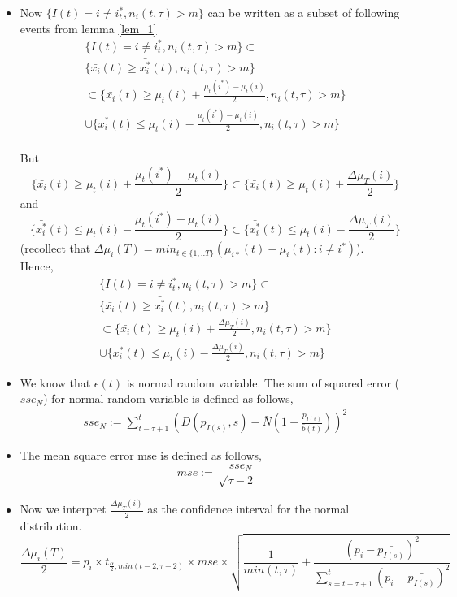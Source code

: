 \documentclass[compress, serif, onlymath, professionalfonts]{beamer}
\begin{document}
\begin{frame}[t,allowframebreaks]
\begin{enumerate}
\begin{itemize}
\item Now $\{I(t)=i\neq i^*_t, n_i(t,\tau)> m\}$ can be written as a subset of following events from lemma \ref{lem_1}
\begin{multline}
\{I(t)=i\neq i^*_t, n_i(t,\tau)> m\} \subset \\
\{\bar{x_i}(t) \geq \bar{x_i^*}(t), n_i(t,\tau)> m\}\\
 \subset \{ \bar{x_i}(t) \geq \mu_t(i) +\frac{\mu_t(i^*)-\mu_t(i)}{2}, n_i(t,\tau)> m\}
\\ \cup \{\bar{x_i^*}(t) \leq \mu_t(i)- \frac{\mu_t(i^*)-\mu_t(i)}{2}, n_i(t,\tau)> m\}
\end{multline}
\\
But $$\{ \bar{x_i}(t) \geq \mu_t(i) +\frac{\mu_t(i^*)-\mu_t(i)}{2}\} \subset \{ \bar{x_i}(t) \geq \mu_t(i) +\frac{\Delta\mu_T(i)}{2}\}$$
and
$$\{\bar{x_i^*}(t) \leq \mu_t(i)- \frac{\mu_t(i^*)-\mu_t(i)}{2}\} \subset \{\bar{x_i^*}(t) \leq \mu_t(i)- \frac{\Delta\mu_T(i)}{2}\} $$
(recollect that $\Delta \mu_i(T)=min_{t \in \{1,..T\}}(\mu_{i*}(t)-\mu_i(t):i \neq i^*)$).\\
Hence,
\begin{multline}
\label{eq5_1}
\{I(t)=i\neq i^*_t, n_i(t,\tau)> m\} \subset \\
\{\bar{x_i}(t) \geq \bar{x_i^*}(t), n_i(t,\tau)> m\}\\
 \subset \{ \bar{x_i}(t) \geq \mu_t(i) +\frac{\Delta\mu_T(i)}{2}, n_i(t,\tau)> m\}
\\ \cup \{ \bar{x_i^*}(t) \leq \mu_t(i)-\frac{\Delta\mu_T(i)}{2}, n_i(t,\tau)> m\}
\end{multline}
 \item
We know that $\epsilon(t)$ is normal random variable. The sum of squared error ($sse_N$)  for normal random variable is defined as follows,
\begin{equation}
\begin{split}
sse_N:=\sum_{t-\tau+1}^{t}(D(p_{I(s)},s)-\bar{N}(1-\frac{p_{I(s)}}{\bar{b}(t)}))^2 
\end{split}
\end{equation}
\item
The mean square error mse is defined as follows,
$$mse:=\sqrt\frac{sse_N}{\tau-2}$$
 \item Now we interpret $\frac{\Delta\mu_T(i)}{2}$  as the confidence interval for the normal distribution. 
 $$\frac{\Delta\mu_i(T)}{2} = p_i\times t_{\frac{\alpha}{2},min(t-2,\tau-2)}\times mse \times \sqrt{\frac{1}{min(t,\tau)}+\frac{(p_i-\bar{p_{I(s)}})^2}{\sum_{s=t-\tau+1}^{t}(p_i-\bar{p_{I(s)}})^2}}$$
 

\end{itemize}
\end{enumerate}
\end{frame}
\end{document}
